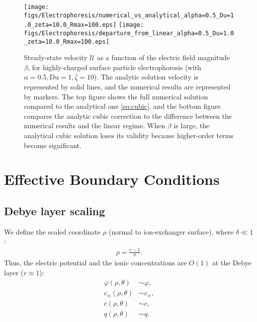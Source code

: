 \documentclass[MSc,beforeExam]{iitcsthesis}
\newcommand\cU{\mathscr{U}}
\begin{document}
\begin{figure}
    \begin{center}
    \texttt{[image: figs/Electrophoresis/numerical\_vs\_analytical\_alpha=0.5\_Du=1.0\_zeta=10.0\_Rmax=100.eps]}
    \texttt{[image: figs/Electrophoresis/departure\_from\_linear\_alpha=0.5\_Du=1.0\_zeta=10.0\_Rmax=100.eps]}
        \caption[Highly-charged surface particle steady-state velocity]{
        Steady-state velocity $\cU$ as a function of the 
        electric field magnitude $\beta$, for highly-charged surface particle
        electrophoresis (with $\alpha = 0.5, \text{Du} = 1, \bar\zeta = 10$).
        The analytic solution velocity is represented by solid lines, 
        and the numerical results are represented by markers.
        The top figure shows the full numerical solution 
        compared to the analytical one \eqref{eq:cubic}, and
        the bottom figure compares the analytic cubic correction \cite{schnitzer2012cubic} 
        to the difference between the numerical results and the linear regime.
        When $\beta$ is large, the analytical cubic solution loses its validity 
        because higher-order terms become significant.}
	    \label{fig:Electrophoresis2}
    \end{center}
\end{figure}

\appendix

\chapter{Effective Boundary Conditions} \label{append:slip}

\section{Debye layer scaling}

We define the scaled coordinate $\rho$ (normal to ion-exchanger surface), where $\delta \ll 1$:
\begin{align}
  \rho = \frac{r-1}{\delta}. 
\end{align}
Thus, the electric potential and the ionic concentrations are $O(1)$ at the Debye layer ($r \approx 1$):
\begin{align}
  \varphi(\rho,\theta) &\sim \varphi, \\
  c_\pm(\rho,\theta) &\sim c_\pm, \\
  c(\rho,\theta) &\sim c, \\
  q(\rho,\theta) &\sim q.
\end{align}
\end{document}
